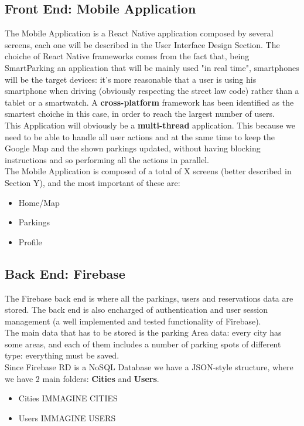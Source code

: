 \documentclass[11pt]{article} %
\begin{document}
\subsection{Front End: Mobile Application}
The Mobile Application is a React Native application composed by several screens, each one will be described in the User Interface Design Section. The choiche of React Native frameworks comes from the fact that, being SmartParking an application that will be mainly used "in real time", smartphones will be the target devices: it's more reasonable that a user is using his smartphone when driving (obviously respecting the street law code) rather than a tablet or a smartwatch. A \textbf{cross-platform} framework has been identified as the smartest choiche in this case, in order to reach the largest number of users.\\
This Application will obviously be a \textbf{multi-thread} application. This because we need to be able to handle all user actions and at the same time to keep the Google Map and the shown parkings updated, without having blocking instructions and so performing all the actions in parallel.\\
The Mobile Application is composed of a total of X screens (better described in Section Y), and the most important of these are:
\begin{itemize}
\item {Home/Map}
\item {Parkings}
\item {Profile}
\end{itemize}

\subsection{Back End: Firebase}
The Firebase back end is where all the parkings, users and reservations data are stored. The back end is also encharged of authentication and user session management (a well implemented and tested functionality of Firebase). \\
The main data that has to be stored is the parking Area data: every city has some areas, and each of them includes a number of parking spots of different type: everything must be saved. \\
Since Firebase RD is a NoSQL Database we have a JSON-style structure, where we have 2 main folders: \textbf{Cities} and \textbf{Users}. 
\begin{itemize}
\item{Cities} 
IMMAGINE CITIES
\item{Users} 
IMMAGINE USERS
\end{itemize}
\end{document}
